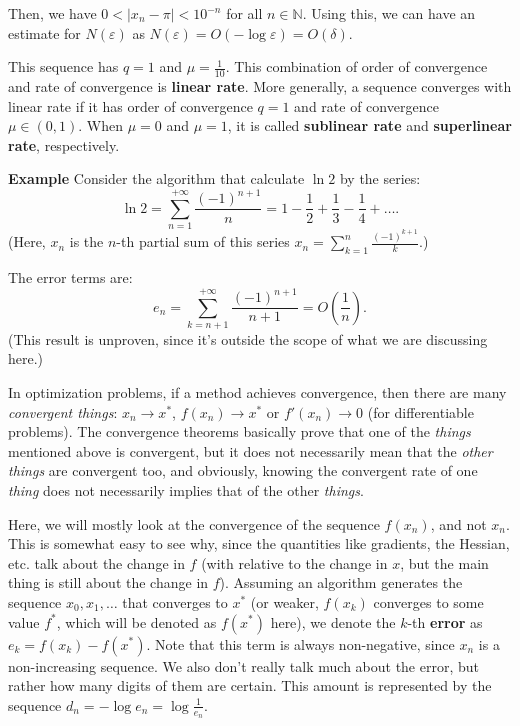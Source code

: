 Then, we have \( 0 < |x_{n} - \pi| < 10^{-n} \) for all \( n \in \mathbb{N} \).
Using this, we can have an estimate for \( N(\varepsilon) \) as \(
N(\varepsilon) = O(-\log \varepsilon) = O(\delta) \).

This sequence has \( q = 1 \) and \( \mu = \frac{1}{10} \). This combination of
order of convergence and rate of convergence is \textbf{linear rate}. More
generally, a sequence converges with linear rate if it has order of convergence
\( q = 1 \) and rate of convergence \( \mu \in (0, 1) \). When \( \mu = 0 \) and
\( \mu = 1 \), it is called \textbf{sublinear rate} and \textbf{superlinear
rate}, respectively.

\textbf{Example} Consider the algorithm that calculate \( \ln 2 \) by the series:
\[
  \ln 2 = \sum_{n = 1}^{+\infty} \frac{(-1)^{n+1}}{n} =
  1-\frac{1}{2}+\frac{1}{3}-\frac{1}{4}+\ldots 
.\] 
(Here, \( x_{n} \) is the \( n \)-th partial sum of this series \( x_{n} = \sum_{k =
1}^{n} \frac{(-1)^{k + 1}}{k} \).)

The error terms are:
\[
  e_{n} = \sum_{k = n + 1}^{+\infty} \frac{(-1)^{n+1}}{n + 1} = O \left(
  \frac{1}{n} \right) 
.\]
(This result is unproven, since it's outside the scope of what we are discussing
here.)

In optimization problems, if a method achieves convergence, then there are many
\textit{convergent things}: \( x_{n} \to x^{*} \), \( f(x_{n}) \to x^{*} \) or \(
f'(x_{n}) \to 0 \) (for differentiable problems). The convergence theorems
basically prove that one of the \textit{things} mentioned above is convergent, but it
does not necessarily mean that the \textit{other things} are convergent too, and
obviously, knowing the convergent rate of one \textit{thing} does not
necessarily implies that of the other \textit{things}.

Here, we will mostly look at the convergence of the sequence \( f(x_{n}) \), and not
\( x_{n} \). This is somewhat easy to see why, since the quantities like gradients, the
Hessian, etc. talk about the change in \( f \) (with relative to the change in
\( x \), but the main thing is still about the change in \( f \)). Assuming an
algorithm generates
the sequence \( x_{0}, x_{1}, \ldots  \) that converges to \( x^{*} \) (or
weaker, \( f(x_{k}) \) converges to some value \( f^{*} \), which will be
denoted as \( f(x^{*}) \) here),
we denote the \( k \)-th \textbf{error} as \( e_{k} = f(x_{k}) - f(x^{*}) \).
Note that this term is always non-negative, since \( x_{n} \) is a
non-increasing sequence.
We also don't really talk much about the error, but rather how many digits of
them are certain. This amount is represented by the sequence \( d_{n}= -\log
e_{n} = \log \frac{1}{e_{n}}  \).

